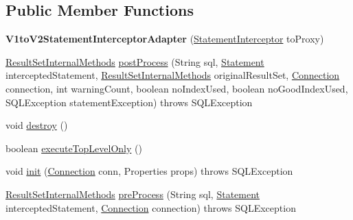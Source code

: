 \subsection*{Public Member Functions}
\begin{DoxyCompactItemize}
\item 
\mbox{\label{classcom_1_1mysql_1_1jdbc_1_1_v1to_v2_statement_interceptor_adapter_aea3b581f998f5eafad269c05b98bea29}} 
{\bfseries V1to\+V2\+Statement\+Interceptor\+Adapter} (\mbox{\hyperlink{interfacecom_1_1mysql_1_1jdbc_1_1_statement_interceptor}{Statement\+Interceptor}} to\+Proxy)
\item 
\mbox{\hyperlink{interfacecom_1_1mysql_1_1jdbc_1_1_result_set_internal_methods}{Result\+Set\+Internal\+Methods}} \mbox{\hyperlink{classcom_1_1mysql_1_1jdbc_1_1_v1to_v2_statement_interceptor_adapter_ab1a3f9ab0d2156eb2fbe442e39354ece}{post\+Process}} (String sql, \mbox{\hyperlink{interfacecom_1_1mysql_1_1jdbc_1_1_statement}{Statement}} intercepted\+Statement, \mbox{\hyperlink{interfacecom_1_1mysql_1_1jdbc_1_1_result_set_internal_methods}{Result\+Set\+Internal\+Methods}} original\+Result\+Set, \mbox{\hyperlink{interfacecom_1_1mysql_1_1jdbc_1_1_connection}{Connection}} connection, int warning\+Count, boolean no\+Index\+Used, boolean no\+Good\+Index\+Used, S\+Q\+L\+Exception statement\+Exception)  throws S\+Q\+L\+Exception 
\item 
void \mbox{\hyperlink{classcom_1_1mysql_1_1jdbc_1_1_v1to_v2_statement_interceptor_adapter_adca046793aea90f93e607ca0c8e7f34b}{destroy}} ()
\item 
boolean \mbox{\hyperlink{classcom_1_1mysql_1_1jdbc_1_1_v1to_v2_statement_interceptor_adapter_aa5c3d7a91f90891f02b1a33310e4efb6}{execute\+Top\+Level\+Only}} ()
\item 
void \mbox{\hyperlink{classcom_1_1mysql_1_1jdbc_1_1_v1to_v2_statement_interceptor_adapter_acf5784b9b687c7d58d92492e2bd6a800}{init}} (\mbox{\hyperlink{interfacecom_1_1mysql_1_1jdbc_1_1_connection}{Connection}} conn, Properties props)  throws S\+Q\+L\+Exception 
\item 
\mbox{\hyperlink{interfacecom_1_1mysql_1_1jdbc_1_1_result_set_internal_methods}{Result\+Set\+Internal\+Methods}} \mbox{\hyperlink{classcom_1_1mysql_1_1jdbc_1_1_v1to_v2_statement_interceptor_adapter_a51a9e9ad7779917b8755806589849559}{pre\+Process}} (String sql, \mbox{\hyperlink{interfacecom_1_1mysql_1_1jdbc_1_1_statement}{Statement}} intercepted\+Statement, \mbox{\hyperlink{interfacecom_1_1mysql_1_1jdbc_1_1_connection}{Connection}} connection)  throws S\+Q\+L\+Exception 
\end{DoxyCompactItemize}


